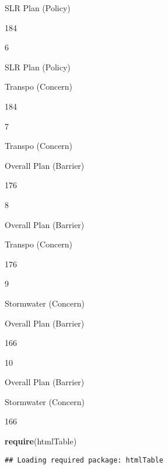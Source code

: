 \documentclass[
]{article}
\newenvironment{Shaded}{\begin{snugshade}}{\end{snugshade}}
\newcommand{\KeywordTok}[1]{\textcolor[rgb]{0.13,0.29,0.53}{\textbf{#1}}}
\newcommand{\NormalTok}[1]{#1}
\begin{document}
SLR Plan (Policy)

184

6

SLR Plan (Policy)

Transpo (Concern)

184

7

Transpo (Concern)

Overall Plan (Barrier)

176

8

Overall Plan (Barrier)

Transpo (Concern)

176

9

Stormwater (Concern)

Overall Plan (Barrier)

166

10

Overall Plan (Barrier)

Stormwater (Concern)

166

\begin{Shaded}
\begin{Highlighting}[]
\KeywordTok{require}\NormalTok{(htmlTable)}
\end{Highlighting}
\end{Shaded}

\begin{verbatim}
## Loading required package: htmlTable
\end{verbatim}
\end{document}

